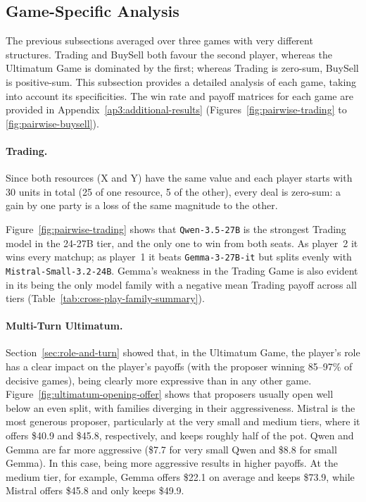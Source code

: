 \subsection{Game-Specific Analysis}

The previous subsections averaged over three games with very different structures. Trading and BuySell both favour the second player, whereas the Ultimatum Game is dominated by the first; whereas Trading is zero-sum, BuySell is positive-sum. This subsection provides a detailed analysis of each game, taking into account its specificities. The win rate and payoff matrices for each game are provided in Appendix~\ref{ap3:additional-results} (Figures~\ref{fig:pairwise-trading} to \ref{fig:pairwise-buysell}).

\paragraph{Trading.}

Since both resources (X and Y) have the same value and each player starts with 30 units in total (25 of one resource, 5 of the other), every deal is zero-sum: a gain by one party is a loss of the same magnitude to the other. 

Figure~\ref{fig:pairwise-trading} shows that \texttt{Qwen-3.5-27B} is the strongest Trading model in the 24-27B tier, and the only one to win from both seats. As player~2 it wins every matchup; as player~1 it beats \texttt{Gemma-3-27B-it} but splits evenly with \texttt{Mistral-Small-3.2-24B}. Gemma's weakness in the Trading Game is also evident in its being the only model family with a negative mean Trading payoff across all tiers (Table~\ref{tab:cross-play-family-summary}).

\paragraph{Multi-Turn Ultimatum.}

Section~\ref{sec:role-and-turn} showed that, in the Ultimatum Game, the player's role has a clear impact on the player's payoffs (with the proposer winning 85--97\% of decisive games), being clearly more expressive than in any other game. Figure~\ref{fig:ultimatum-opening-offer} shows that proposers usually open well below an even split, with families diverging in their aggressiveness. Mistral is the most generous proposer, particularly at the very small and medium tiers, where it offers \$40.9 and \$45.8, respectively, and keeps roughly half of the pot. Qwen and Gemma are far more aggressive (\$7.7 for very small Qwen and \$8.8 for small Gemma). In this case, being more aggressive results in higher payoffs. At the medium tier, for example, Gemma offers \$22.1 on average and keeps \$73.9, while Mistral offers \$45.8 and only keeps \$49.9.

